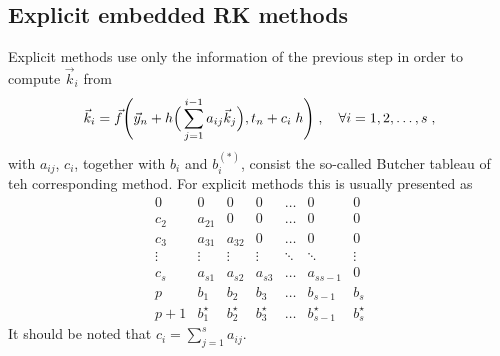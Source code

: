 \documentclass[11pt,a4paper]{article}
\begin{document}
\subsection{Explicit embedded RK methods}
%
Explicit methods use only the information of the previous step in order to compute $\vec{k}_i$ from  
%
\begin{equation}
	\vec{k}_{i}=\vec f\Bigg(  \vec{y}_{n}+h \Big(  \sum_{j=1}^{i-1}a_{ij}\vec{k}_{j}  \Big), t_{n}+ c_{i} \; h \Bigg)\;, \quad \forall i=1,2,\dots, s\;,
	\label{eq:explicit_RK_k}
\end{equation}
%
with $a_{ij}$, $c_i$, together with $b_i$ and $b_i^{(*)}$, consist the so-called Butcher tableau of teh corresponding method. For explicit methods this is usually presented as 
%
\begin{equation}
	\begin{array}{c|cccccc}
		0      & 0      &   0   &      0& \dots & 0& 0\\
		c_2    & a_{21} &   0   &   0   & \dots & 0& 0\\
		c_3    & a_{31} & a_{32}&      0& \dots & 0& 0\\
		\vdots & \vdots & \vdots& \vdots&\ddots &\ddots& \vdots\\
		c_s    & a_{s1} & a_{s2}& a_{s3}& \dots & a_{s s-1}& 0 \\
		\hline
		p      & b_1    & b_2  & b_3 & \dots & b_{s-1} & b_s \\
		p+1      & b_1^{\star}    & b_2^{\star}  & b_3^{\star} & \dots & b_{s-1}^{\star} & b_s^{\star}
	\end{array}
	\label{eq:Butcher}
\end{equation}
%
It should be noted that $c_i = \displaystyle\sum_{j=1}^{s} a_{ij} $.
\end{document}
